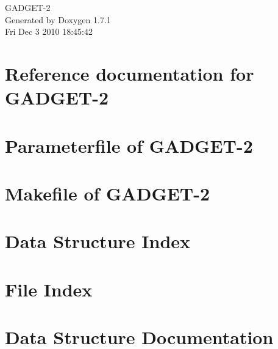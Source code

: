 \documentclass[a4paper]{book}
\begin{document}
\hypersetup{pageanchor=false}
\begin{titlepage}
\vspace*{7cm}
\begin{center}
{\Large GADGET-\/2 }\\
\vspace*{1cm}
{\large Generated by Doxygen 1.7.1}\\
\vspace*{0.5cm}
{\small Fri Dec 3 2010 18:45:42}\\
\end{center}
\end{titlepage}
\clearemptydoublepage
{}
\tableofcontents
\clearemptydoublepage
{}
\hypersetup{pageanchor=true}
\chapter{Reference documentation for GADGET-\/2}
\label{index}\hypertarget{index}{}
\chapter{Parameterfile of GADGET-\/2}
\label{parameterfile}
\hypertarget{parameterfile}{}

\chapter{Makefile of GADGET-\/2}
\label{Gadget-Makefile}
\hypertarget{Gadget-Makefile}{}

\chapter{Data Structure Index}

\chapter{File Index}

\chapter{Data Structure Documentation}

















\end{document}
